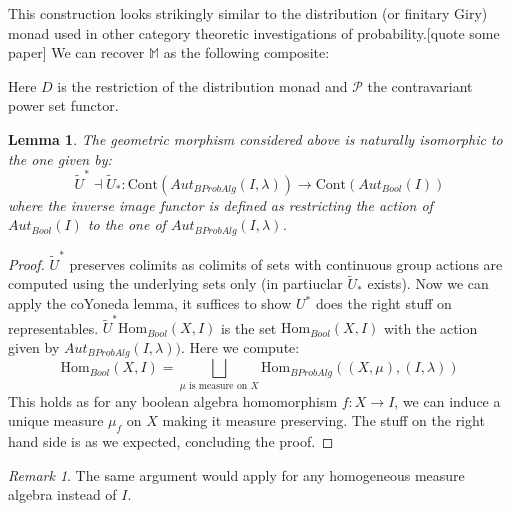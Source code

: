 \documentclass[a4paper]{amsproc}
\theoremstyle{plain}
\newtheorem{lemma}{Lemma}[section]
\theoremstyle{definition}
\theoremstyle{remark}
\newtheorem{remark}{Remark}[section]
\numberwithin{equation}{section}
\begin{document}
This construction looks strikingly similar to the distribution (or finitary Giry) monad used in other category theoretic investigations of probability.[quote some paper] We can recover $\mathbb{M}$ as the following composite:
\begin{center}
\end{center}
Here $D$ is the restriction of the distribution monad and $\mathcal{P}$ the contravariant power set functor.
\begin{lemma} The geometric morphism considered above is naturally isomorphic to the one given by:
\[\tilde{U}^*\dashv \tilde{U}_*:\text{Cont}(Aut_{BProbAlg}(I,\lambda))\rightarrow\text{Cont}(Aut_{Bool}(I))\]
where the inverse image functor is defined as restricting the action of $Aut_{Bool}(I)$ to the one of $Aut_{BProbAlg}(I,\lambda)$.
\end{lemma}
\begin{proof} 
$\tilde{U}^*$ preserves colimits as colimits of sets with continuous group actions are computed using the underlying sets only (in partiuclar $\tilde{U}_*$ exists).
Now we can apply the coYoneda lemma, it suffices to show $U^*$ does the right stuff on representables.
  $\tilde{U}^*\text{Hom}_{Bool}(X,I)$ is the set 
$\text{Hom}_{Bool}(X,I)$ with the action given by $Aut_{BProbAlg}(I,\lambda))$. Here we compute:
\[\text{Hom}_{Bool}(X,I)=\bigsqcup_{\mu\text{ is measure on }X}\text{Hom}_{BProbAlg}((X,\mu),(I,\lambda))\]
This holds as for any boolean algebra homomorphism $f:X\rightarrow I$, we can induce a unique measure $\mu_f$ on $X$ making it measure preserving. The stuff on the right hand side is as we expected, concluding the proof.
\end{proof}
\begin{remark} The same argument would apply for any homogeneous measure algebra instead of $I$.
\end{remark}
\end{document}
